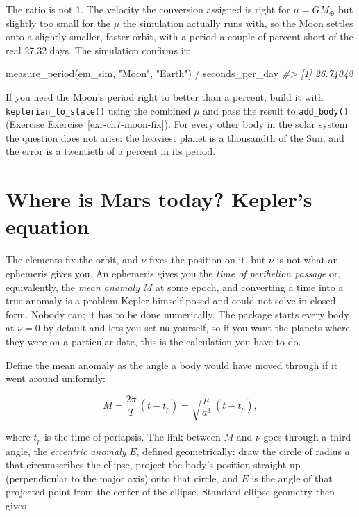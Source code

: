 \documentclass[
  10.5pt,
  letterpaper,
]{scrbook}
\newenvironment{Shaded}{\begin{snugshade}}{\end{snugshade}}
\newcommand{\CommentTok}[1]{\textcolor[rgb]{0.00,0.00,0.00}{\textit{#1}}}
\newcommand{\FunctionTok}[1]{\textcolor[rgb]{0.00,0.00,0.00}{#1}}
\newcommand{\NormalTok}[1]{\textcolor[rgb]{0.00,0.00,0.00}{#1}}
\newcommand{\SpecialCharTok}[1]{\textcolor[rgb]{0.00,0.00,0.00}{#1}}
\newcommand{\StringTok}[1]{\textcolor[rgb]{0.00,0.00,0.00}{#1}}
\theoremstyle{definition}
\theoremstyle{plain}
\theoremstyle{remark}
\begin{document}
The ratio is not 1. The velocity the conversion assigned is right for
\(\mu = GM_\oplus\) but slightly too small for the \(\mu\) the
simulation actually runs with, so the Moon settles onto a slightly
smaller, faster orbit, with a period a couple of percent short of the
real 27.32 days. The simulation confirms it:

\begin{Shaded}
\begin{Highlighting}[]
\FunctionTok{measure\_period}\NormalTok{(em\_sim, }\StringTok{"Moon"}\NormalTok{, }\StringTok{"Earth"}\NormalTok{) }\SpecialCharTok{/}\NormalTok{ seconds\_per\_day}
\CommentTok{\#\textgreater{} [1] 26.74042}
\end{Highlighting}
\end{Shaded}

If you need the Moon's period right to better than a percent, build it
with \texttt{keplerian\_to\_state()} using the combined \(\mu\) and pass
the result to \texttt{add\_body()} (Exercise
Exercise~\ref{exr-ch7-moon-fix}). For every other body in the solar
system the question does not arise: the heaviest planet is a thousandth
of the Sun, and the error is a twentieth of a percent in its period.

\section{Where is Mars today? Kepler's
equation}\label{where-is-mars-today-keplers-equation}

The elements fix the orbit, and \(\nu\) fixes the position on it, but
\(\nu\) is not what an ephemeris gives you. An ephemeris gives you the
\emph{time of perihelion passage} or, equivalently, the \emph{mean
anomaly} \(M\) at some epoch, and converting a time into a true anomaly
is a problem Kepler himself posed and could not solve in closed form.
Nobody can; it has to be done numerically. The package starts every body
at \(\nu = 0\) by default and lets you set \texttt{nu} yourself, so if
you want the planets where they were on a particular date, this is the
calculation you have to do.

Define the mean anomaly as the angle a body would have moved through if
it went around uniformly:

\[
M = \frac{2\pi}{T}\,(t - t_p) = \sqrt{\frac{\mu}{a^3}}\,(t - t_p),
\]

where \(t_p\) is the time of periapsis. The link between \(M\) and
\(\nu\) goes through a third angle, the \emph{eccentric anomaly} \(E\),
defined geometrically: draw the circle of radius \(a\) that
circumscribes the ellipse, project the body's position straight up
(perpendicular to the major axis) onto that circle, and \(E\) is the
angle of that projected point from the center of the ellipse. Standard
ellipse geometry then gives
\end{document}
